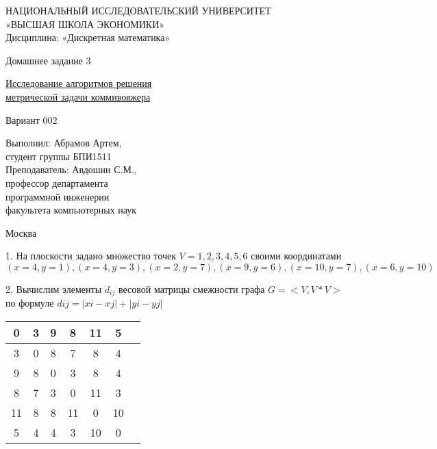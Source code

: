 \documentclass[a4paper,10pt]{article} %
\begin{document}
\begin{titlepage}
\newpage

\begin{center}
{\large НАЦИОНАЛЬНЫЙ ИССЛЕДОВАТЕЛЬСКИЙ УНИВЕРСИТЕТ \\
«ВЫСШАЯ ШКОЛА ЭКОНОМИКИ» \\
Дисциплина: «Дискретная математика»}

\vfill %

{\large Домашнее задание 3}

\bigskip

\underline{ Исследование алгоритмов решения} \\
\underline{ метрической задачи коммивояжера} \\

\bigskip

Вариант 002 \\

\vfill

\begin{flushright}
Выполнил: Абрамов Артем,\\
студент группы БПИ1511\medskip \\
Преподаватель: Авдошин С.М., \\
профессор департамента \\
программной инженерии \\
факультета компьютерных наук
\end{flushright}

\vfill

Москва \number\year

\end{center}
\end{titlepage}



1. \quad На плоскости задано множество точек $V = {1, 2, 3, 4, 5, 6}$ своими координатами
$(x = 4,y = 1),(x = 4,y = 3),(x = 2,y = 7),(x = 9,y = 6),(x = 10,y = 7),(x = 6,y = 10)$ \\

\smallskip

2. \quad Вычислим элементы $d_{ij}$ весовой матрицы смежности графа 
$G = <V, V*V>$ по формуле $dij = |xi - xj|  +  |yi - yj|$

\begin{flushleft}\begin{tabular}[]{|c|c|c|c|c|c|c|}
\hline
  0 &    3 &    9 &    8 &   11 &    5 \\
\hline
  3 &    0 &    8 &    7 &    8 &    4 \\
\hline
  9 &    8 &    0 &    3 &    8 &    4 \\
\hline
  8 &    7 &    3 &    0 &   11 &    3 \\
\hline
 11 &    8 &    8 &   11 &    0 &   10 \\
\hline
  5 &    4 &    4 &    3 &   10 &    0 \\
\hline
\end{tabular}
\end{flushleft}
\end{document}

